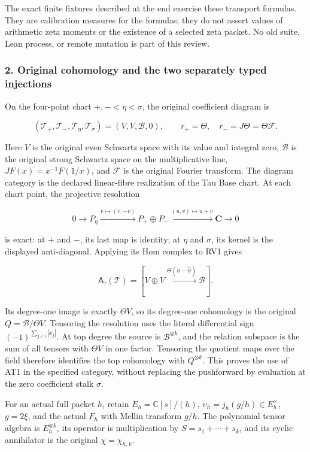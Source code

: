 \documentclass{article}
\begin{document}
The exact finite fixtures described at the end exercise these transport formulas. They are calibration measures for the formulas; they do not assert values of arithmetic zeta moments or the existence of a selected zeta packet. No old suite, Lean process, or remote mutation is part of this review.

\subsubsection{2. Original cohomology and the two separately typed injections}\label{endpoint-determinant_review--original-cohomology-and-the-two-separately-typed-injections}

On the four-point chart \(+,-<\eta<\sigma\), the original coefficient diagram is

\[
(\mathcal T_+,\mathcal T_-,\mathcal T_\eta,\mathcal T_\sigma)
=(V,V,\mathscr B,0),\qquad
r_+=\Theta,\quad r_-=J\Theta=\Theta\mathcal F.
\tag{RV1}
\]

Here \(V\) is the original even Schwartz space with its value and integral zero, \(\mathscr B\) is the original strong Schwartz space on the multiplicative line, \(JF(x)=x^{-1}F(1/x)\), and \(\mathcal F\) is the original Fourier transform. The diagram category is the declared linear-fibre realization of the Tau Base chart. At each chart point, the projective resolution

\[
0\to P_\eta\xrightarrow{v\mapsto(v,-v)}
P_+\oplus P_-\xrightarrow{(u,v)\mapsto u+v}\mathbf C\to0
\tag{RV2}
\]

is exact: at \(+\) and \(-\), its last map is identity; at \(\eta\) and \(\sigma\), its kernel is the displayed anti-diagonal. Applying its Hom complex to RV1 gives

\[
\mathsf A_\tau(\mathcal T)
=[V\oplus V\xrightarrow{\Theta(\phi-\widehat\psi)}\mathscr B].
\tag{RV3}
\]

Its degree-one image is exactly \(\Theta V\), so its degree-one cohomology is the original \(Q=\mathscr B/\Theta V\). Tensoring the resolution uses the literal differential sign \((-1)^{\sum_{j<i}|x_j|}\). At top degree the source is \(\mathscr B^{\otimes k}\), and the relation subspace is the sum of all tensors with \(\Theta V\) in one factor. Tensoring the quotient maps over the field therefore identifies the top cohomology with \(Q^{\otimes k}\). This proves the use of AT1 in the specified category, without replacing the pushforward by evaluation at the zero coefficient stalk \(\sigma\).

For an actual full packet \(h\), retain \(E_h=\mathbb C[s]/(h)\), \(\upsilon_h=j_h(g/h)\in E_h^\times\), \(g=2\xi\), and the actual \(F_h\) with Mellin transform \(g/h\). The polynomial tensor algebra is \(E_h^{\otimes k}\), its operator is multiplication by \(S=s_1+\cdots+s_k\), and its cyclic annihilator is the original \(\chi=\chi_{h,k}\).
\end{document}
